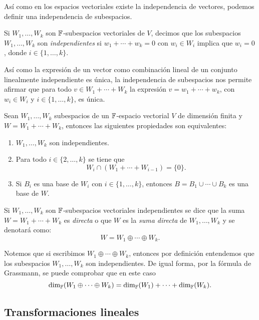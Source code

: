 Así como en los espacios vectoriales existe la independencia de vectores, podemos definir una independencia de subespacios.

\begin{defi}
  Si $W_1, \ldots, W_k$ son $\mathbb{F}$-subespacios vectoriales de $V$, decimos que los subespacios $W_1, \ldots, W_k$ son \emph{independientes} si $w_1 + \cdots + w_k = 0$ con $w_i \in W_i$ implica que $w_i = 0$, donde $i \in \{1,\ldots,k\}$.
\end{defi}

Así como la expresión de un vector como combinación lineal de un conjunto linealmente independiente es única, la independencia de subespacios nos permite afirmar que para todo $v \in W_1 + \cdots + W_k$ la expresión $v = w_1 + \cdots + w_k$, con $w_i \in W_i$ y $i \in \{1, \ldots, k\}$, es única.
\begin{teor}
  Sean $W_1, \ldots, W_k$ subespacios de un $\mathbb{F}$-espacio vectorial $V$ de dimensión finita y $W = W_1 + \cdots + W_k$, entonces las siguientes propiedades son equivalentes:
  \begin{enumerate}
    \item $W_1, \ldots, W_k$ son independientes.
    \item Para todo $i \in \{2, \ldots, k\}$ se tiene que
            \[ W_i \cap (W_1 + \cdots + W_{i-1})  = \{0\}. \]
    \item Si $B_i$ es una base de $W_i$ con $i \in \{1, \ldots, k\}$, entonces $B = B_1 \cup  \cdots \cup  B_k$ es una base de $W$.
  \end{enumerate}
\end{teor}

\begin{defi}
  Si $W_1, \ldots, W_k$ son $\mathbb{F}$-subespacios vectoriales independientes se dice que la suma $W = W_1 + \cdots + W_k$ es \emph{directa} o que $W$ es la \emph{suma directa} de  $W_1, \ldots, W_k$ y se denotará como:
    \[ W =  W_1 \oplus \cdots \oplus W_k.\]
\end{defi}

Notemos que si escribimos $W_1 \oplus \cdots \oplus W_k$, entonces por definición entendemos que los subespacios $W_1, \ldots, W_k$ son independientes. De igual forma, por la fórmula de Grassmann, se puede comprobar que en este caso
\[ \dim_{\mathbb{F}} (W_1 \oplus \cdots \oplus W_k) = \dim_{\mathbb{F}} (W_1) + \cdots + \dim_{\mathbb{F}} (W_k).\]

\subsection{Transformaciones lineales}

